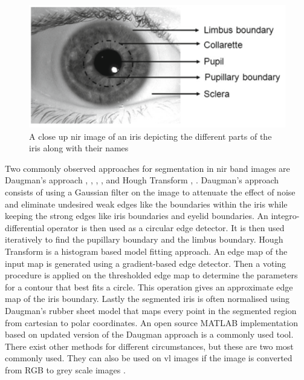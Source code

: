 \begin{figure}[H]
\centering
\includegraphics[width=\textwidth]{figures/iris_naming.png} 
\caption{A close up \gls{nir} image of an iris depicting the different parts of the iris along with their names \citep{Bowyer2016b}}
\label{fig:iris_naming}
\end{figure}

Two commonly observed approaches for segmentation in \gls{nir} band images are Daugman's approach \citep{Daugman1993} , \citep{Saha2017}, \citep{Rattani2017}, \citep{Khan2017}, and Hough Transform \citep{Luhadiya2017}, \citep{Uka2017}. Daugman's approach consists of using a Gaussian filter on the image to attenuate the effect of noise and eliminate undesired weak edges like the boundaries within the iris while keeping the strong edges like iris boundaries and eyelid boundaries. An integro-differential operator is then used as a circular edge detector. It is then used iteratively to find the pupillary boundary and the limbus boundary. Hough Transform is a histogram based model fitting approach. An edge map of the input map is generated using a gradient-based edge detector. Then a voting procedure is applied on the thresholded edge map to determine the parameters for a contour that best fits a circle. This operation gives an approximate edge map of the iris boundary. Lastly the segmented iris is often normalised using Daugman's rubber sheet model that maps every point in the segmented region from cartesian to polar coordinates. An open source MATLAB implementation based on updated version of the Daugman approach is a commonly used tool. There exist other methods for different circumstances, but these are two most commonly used. They can also be used on \gls{vl} images if the image is converted from RGB to grey scale images \citep{Bowyer2016b} . 

